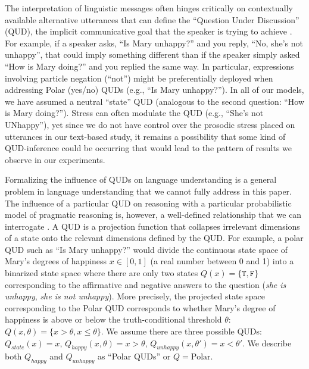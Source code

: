 \documentclass[floatsintext,doc]{apa6}
\begin{document}
The interpretation of linguistic messages often hinges critically on contextually available alternative utterances that can define the ``Question Under Discussion'' (QUD), the implicit communicative goal that the speaker is trying to achieve \cite{roberts2012information, beaver2017questions}. 
For example, if a speaker asks, ``Is Mary unhappy?'' and you reply, ``No, she's not unhappy'', that could imply something different than if the speaker simply asked ``How is Mary doing?'' and you replied the same way.
In particular, expressions involving particle negation (``not'') might be preferentially deployed when addressing Polar (yes/no) QUDs (e.g., ``Is Mary unhappy?'').
In all of  our models, we have assumed a neutral ``state'' QUD (analogous to the second question: ``How is Mary doing?''). 
Stress can often modulate the QUD (e.g., ``She's not UNhappy''), yet since we do not have control over the prosodic stress placed on utterances in our text-based study, it remains a possibility that some kind of QUD-inference could be occurring that would lead to the pattern of results we observe in our experiments. 

Formalizing the influence of QUDs on language understanding is a general problem in language understanding that we cannot fully address in this paper. 
The influence of a particular QUD on reasoning with a particular probabilistic model of pragmatic reasoning is, however, a well-defined relationship that we can interrogate \cite{kao2014nonliteral, hawkins2015you, hawkins_goodman_2017}. 
A QUD is a projection function that collapses irrelevant dimensions of a state onto the relevant dimensions defined by the QUD. 
For example, a polar QUD such as ``Is Mary unhappy?'' would divide the continuous state space of Mary's degrees of happiness $x \in [0, 1]$  (a real number between 0 and 1) into a binarized state space where there are only two states $Q(x) = \{\texttt{T}, \texttt{F}\}$ corresponding to the affirmative and negative answers to the question (\emph{she is unhappy}, \emph{she is not unhappy}). 
More precisely, the projected state space corresponding to the Polar QUD corresponds to whether Mary's degree of happiness is above or below the truth-conditional threshold $\theta$:  $Q(x, \theta) = \{x > \theta, x \leq \theta\}$.  
We assume there are three possible QUDs: $Q_{state}(x) = x$, $Q_{happy}(x, \theta) = x > \theta$, $Q_{unhappy}(x, \theta') = x< \theta'$. We describe both $Q_{happy}$ and $Q_{unhappy}$ as ``Polar QUDs'' or $Q = \text{Polar}$. 
 
\end{document}
